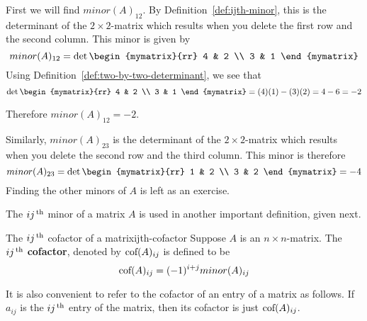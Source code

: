 \begin{solution}
  First we will find $minor(A) _{12}$. By
  Definition~\ref{def:ijth-minor}, this is the determinant of the
  $2\times 2$-matrix which results when you delete the first row and
  the second column. This minor is given by
  \begin{equation*}
    minor (A)_{12}
    =
    \det \begin{mymatrix}{rr}
      4 & 2 \\
      3 & 1
    \end{mymatrix}
  \end{equation*}
  Using Definition~\ref{def:two-by-two-determinant}, we see that
  \begin{equation*}
    \det \begin{mymatrix}{rr}
      4 & 2 \\
      3 & 1
    \end{mymatrix} = (4)(1) - (3)(2) = 4 - 6 = -2
  \end{equation*}

  Therefore $minor (A)_{12} = -2$. 

  Similarly, $minor(A)_{23}$ is the determinant of the
  $2\times 2$-matrix which results when you delete the second row and
  the third column. This minor is therefore
  \begin{equation*}
    minor (A)_{23} 
    =
    \det \begin{mymatrix}{rr}
      1 & 2 \\
      3 & 2
    \end{mymatrix} = -4
  \end{equation*}
  Finding the other minors of $A$ is left as an exercise.
\end{solution}

The $ij^{\,\rm th}$ minor of a matrix $A$ is used in another important
definition, given next.

\begin{definition}{The $ij^{\,\rm th}$ cofactor of a matrix}{ijth-cofactor}
  Suppose $A$ is an $n\times n$-matrix. The $ij^{\,\rm th}$
  \textbf{cofactor}, denoted by
  $\mbox{\rm cof}(A) _{ij}$ is defined to be
  \begin{equation*}
    \mbox{\rm cof}(A) _{ij} = (-1) ^{i+j} minor(A)_{ij} 
  \end{equation*}
\end{definition}

It is also convenient to refer to the cofactor of an entry of a matrix
as follows. If $a_{ij}$ is the $ij^{\,\rm th}$ entry of the matrix, then its
cofactor is just $\mbox{\rm cof}(A) _{ij}$.

